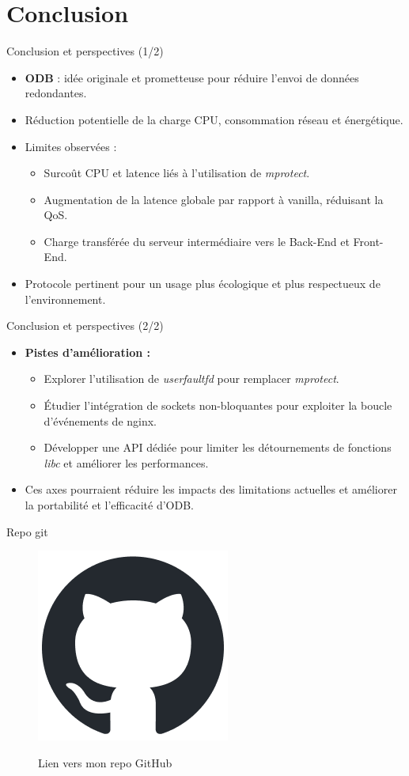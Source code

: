 \documentclass[aspectratio=43,8pt]{beamer}
\begin{document}
\part{Conclusion}
\begin{frame}{Conclusion et perspectives (1/2)}
\begin{itemize}
    \item \textbf{ODB} : idée originale et prometteuse pour réduire l'envoi de données redondantes.
    \item Réduction potentielle de la charge CPU, consommation réseau et énergétique.
    \item Limites observées :
    \begin{itemize}
        \item Surcoût CPU et latence liés à l'utilisation de \textit{mprotect}.
        \item Augmentation de la latence globale par rapport à vanilla, réduisant la QoS.
        \item Charge transférée du serveur intermédiaire vers le Back-End et Front-End.
    \end{itemize}
    \item Protocole pertinent pour un usage plus écologique et plus respectueux de l’environnement.
\end{itemize}
\end{frame}

\begin{frame}{Conclusion et perspectives (2/2)}
\begin{itemize}
    \item \textbf{Pistes d’amélioration :}
    \begin{itemize}
        \item Explorer l’utilisation de \textit{userfaultfd} pour remplacer \textit{mprotect}.
        \item Étudier l’intégration de sockets non-bloquantes pour exploiter la boucle d’événements de nginx.
        \item Développer une API dédiée pour limiter les détournements de fonctions \textit{libc} et améliorer les performances.
    \end{itemize}
    \item Ces axes pourraient réduire les impacts des limitations actuelles et améliorer la portabilité et l’efficacité d'ODB.
\end{itemize}
\end{frame}


\begin{frame}[noframenumbering]{Repo git}
\begin{figure}[h]
    \centering
    \href{https://github.com/BJCode-git/ODB-C}{%
        \includegraphics[scale=1]{img2/github-mark.png}%
    }
    \caption{Lien vers mon repo GitHub}
    \label{fig:github}
\end{figure}
\end{frame}
\end{document}
